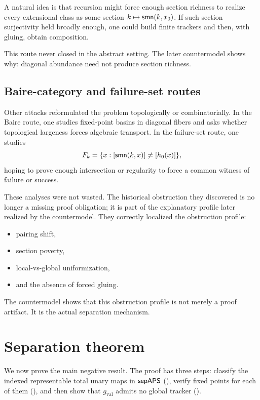 \documentclass[11pt]{article}
\begin{document}
A natural idea is that recursion might force enough section richness to realize every extensional class as some section \(k \mapsto \mathsf{smn}(k,x_0)\).  If such section surjectivity held broadly enough, one could build finite trackers and then, with gluing, obtain composition.

This route never closed in the abstract setting.  The later countermodel shows why: diagonal abundance need not produce section richness.

\subsection{Baire-category and failure-set routes}

Other attacks reformulated the problem topologically or combinatorially.  In the Baire route, one studies fixed-point basins in diagonal fibers and asks whether topological largeness forces algebraic transport.  In the failure-set route, one studies
\[
F_k = \{x : [\mathsf{smn}(k,x)] \neq [h_0(x)]\},
\]
hoping to prove enough intersection or regularity to force a common witness of failure or success.

These analyses were not wasted.  The historical obstruction they discovered is no longer a missing proof obligation; it is part of the explanatory profile later realized by the countermodel.  They correctly localized the obstruction profile:
\begin{itemize}[leftmargin=2em]
\item pairing shift,
\item section poverty,
\item local-vs-global uniformization,
\item and the absence of forced gluing.
\end{itemize}

The countermodel shows that this obstruction profile is not merely a proof artifact.  It is the actual separation mechanism.

\section{Separation theorem}\label{sec:separation}

We now prove the main negative result.  The proof has three steps: classify the indexed representable total unary maps in \(\mathsf{sepAPS}\) (), verify fixed points for each of them (), and then show that \(g_{\mathrm{val}}\) admits no global tracker ().
\end{document}
